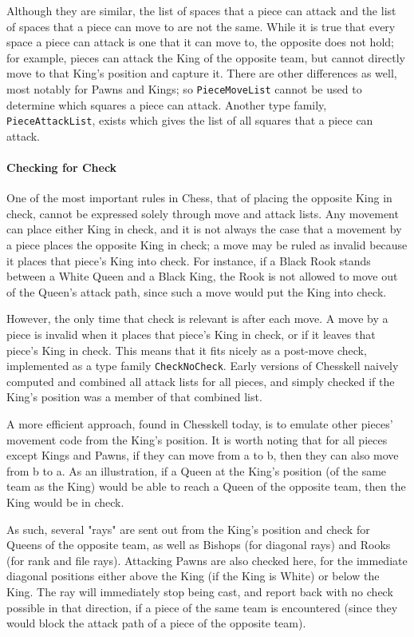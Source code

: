 \documentclass[12pt, a4paper, bibliography=totocnumbered]{scrreprt}
\newcommand{\inline}[1]{\lstinline[basicstyle=\ttfamily\footnotesize]{#1}}
\begin{document}
Although they are similar, the list of spaces that a piece can attack and the list of spaces that a piece can move to are not the same. While it is true that every space a piece can attack is one that it can move to, the opposite does not hold; for example, pieces can attack the King of the opposite team, but cannot directly move to that King's position and capture it. There are other differences as well, most notably for Pawns and Kings; so \inline{PieceMoveList} cannot be used to determine which squares a piece can attack. Another type family, \inline{PieceAttackList}, exists which gives the list of all squares that a piece can attack.

\paragraph{Checking for Check} \label{checksection}

One of the most important rules in Chess, that of placing the opposite King in check, cannot be expressed solely through move and attack lists. Any movement can place either King in check, and it is not always the case that a movement by a piece places the opposite King in check; a move may be ruled as invalid because it places that piece's King into check. For instance, if a Black Rook stands between a White Queen and a Black King, the Rook is not allowed to move out of the Queen's attack path, since such a move would put the King into check.

However, the only time that check is relevant is after each move. A move by a piece is invalid when it places that piece's King in check, or if it leaves that piece's King in check. This means that it fits nicely as a post-move check, implemented as a type family \inline{CheckNoCheck}. Early versions of Chesskell naively computed and combined all attack lists for all pieces, and simply checked if the King's position was a member of that combined list.

A more efficient approach, found in Chesskell today, is to emulate other pieces' movement code from the King's position. It is worth noting that for all pieces except Kings and Pawns, if they can move from a to b, then they can also move from b to a. As an illustration, if a Queen at the King's position (of the same team as the King) would be able to reach a Queen of the opposite team, then the King would be in check.

As such, several "rays" are sent out from the King's position and check for Queens of the opposite team, as well as Bishops (for diagonal rays) and Rooks (for rank and file rays). Attacking Pawns are also checked here, for the immediate diagonal positions either above the King (if the King is White) or below the King. The ray will immediately stop being cast, and report back with no check possible in that direction, if a piece of the same team is encountered (since they would block the attack path of a piece of the opposite team).
\end{document}
